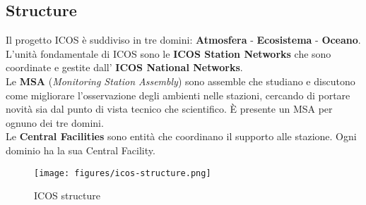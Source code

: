 \subsection{Structure}

Il progetto ICOS è suddiviso in tre domini: \textbf{Atmosfera} - \textbf{Ecosistema} - \textbf{Oceano}. \\

L'unità fondamentale di ICOS sono le \textbf{ICOS Station Networks} che sono coordinate e gestite dall'
\textbf{ICOS National Networks}. \\

Le \textbf{MSA} (\textit{Monitoring Station Assembly}) sono assemble che studiano e discutono come migliorare
l'osservazione degli ambienti nelle stazioni, cercando di portare novità sia dal punto di vista tecnico che scientifico.
È presente un MSA per ognuno dei tre domini. \\

Le \textbf{Central Facilities} sono entità che coordinano il supporto alle stazione. Ogni dominio ha la sua Central Facility. \\

\begin{figure}[h]
    \caption{ICOS structure}
    \centering
    \texttt{[image: figures/icos-structure.png]}
\end{figure}